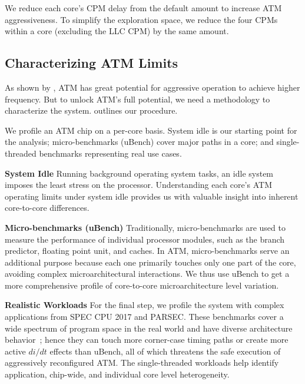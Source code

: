 We reduce each core's CPM delay from the default amount to increase ATM aggressiveness. To simplify the exploration space, we reduce the four CPMs within a core (excluding the LLC CPM) by the same amount.

\subsection{Characterizing ATM Limits}
\label{sec:process:methodology}

As shown by , ATM has great potential for aggressive operation to achieve higher frequency. But to unlock ATM's full potential, we need a methodology to characterize the system.  outlines our procedure. 

We profile an ATM chip on a per-core basis. System idle is our starting point for the analysis; micro-benchmarks (uBench) cover major paths in a core; and single-threaded benchmarks representing real use cases.

\textbf{System Idle} Running background operating system tasks, an idle system imposes the least stress on the processor. {Understanding each core's ATM operating limits under system idle provides us with valuable insight into inherent core-to-core differences.}

\textbf{Micro-benchmarks (uBench)} Traditionally, micro-benchmarks are used to measure the performance of individual processor modules, such as the branch predictor, floating point unit, and caches. In ATM, micro-benchmarks serve an additional purpose because each one primarily touches only one part of the core, avoiding complex microarchitectural interactions. We thus use uBench to get a more comprehensive profile of core-to-core microarchitecture level variation.



\textbf{Realistic Workloads} %
For the final step, we profile the system with complex applications from SPEC CPU 2017 and PARSEC. These benchmarks cover a wide spectrum of program space in the real world and have diverse architecture behavior~\cite{song2018spec,bienia2008parsecsplash}; hence they can touch more corner-case timing paths or create more active $di/dt$ effects than uBench, all of which threatens the safe execution of aggressively reconfigured ATM. {The single-threaded workloads help identify application, chip-wide, and individual core level heterogeneity.}

